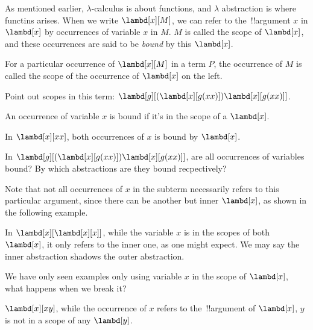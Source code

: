 \documentclass[../../../include/open-logic-section]{subfiles}
\begin{document}

As mentioned earlier, $\lambda$-calculus is about functions, and
$\lambda$ abstraction is where functins arises. When we
write $\lambd[x][M]$, we can refer to the~!!{argument} $x$ in $\lambd[x]$ by
occurrences of variable $x$ in $M$. $M$ is called the
scope of $\lambd[x]$, and these occurrences are said to be \emph{bound} by this
$\lambd[x]$. 

\begin{defn}[Scope]
For a particular occurrence of $\lambd[x][M]$ in a term $P$, the
occurrence of $M$ is called the scope of the occurrence of $\lambd[x]$
on the left.
\end{defn}

\begin{prob}
  Point out scopes in this term: $\lambd[g][(\lambd[x][g (x x)]) \lambd[x][g (x x)]]$.
\end{prob}

\begin{defn}
  An occurrence of variable $x$ is bound if it's in the scope of a $\lambd[x]$.
\end{defn}

\begin{ex}
  In $\lambd[x][x x]$, both occurrences of $x$ is bound by $\lambd[x]$.
\end{ex}

\begin{prob}
  In $\lambd[g][(\lambd[x][g (x x)]) \lambd[x][g (x x)]]$, are all
  occurrences of variables bound? By which abstractions are they
  bound recpectively?
\end{prob}

Note that not all occurrences of $x$ in the subterm necessarily refers to this particular argument,
since there can be another but inner $\lambd[x]$, as shown in the
following example. 
\begin{ex}
In $\lambd[x][\lambd[x][x]]$, while the variable $x$ is in the
scopes of both $\lambd[x]$, it only refers to the inner one, as one
might expect. We may say the inner abstraction shadows the outer
abstraction.
\end{ex}

We have only seen examples only using variable $x$ in the scope of $\lambd[x]$, 
what happens when we break it?
\begin{ex}
  $\lambd[x][x y]$, while the occurrence of $x$ refers to the~!!{argument} of $\lambd[x]$, $y$ is not in a scope
  of any $\lambd[y]$. 
\end{ex}
\end{document}
